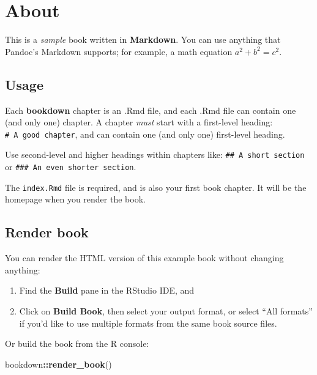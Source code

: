 \documentclass[
]{book}
\newenvironment{Shaded}{\begin{snugshade}}{\end{snugshade}}
\newcommand{\FunctionTok}[1]{\textcolor[rgb]{0.13,0.29,0.53}{\textbf{#1}}}
\newcommand{\NormalTok}[1]{#1}
\newcommand{\SpecialCharTok}[1]{\textcolor[rgb]{0.81,0.36,0.00}{\textbf{#1}}}
\theoremstyle{definition}
\theoremstyle{definition}
\theoremstyle{definition}
\theoremstyle{definition}
\theoremstyle{remark}
\begin{document}
\section{About}\label{about}

This is a \emph{sample} book written in \textbf{Markdown}. You can use anything that Pandoc's Markdown supports; for example, a math equation \(a^2 + b^2 = c^2\).

\subsection{Usage}\label{usage}

Each \textbf{bookdown} chapter is an .Rmd file, and each .Rmd file can contain one (and only one) chapter. A chapter \emph{must} start with a first-level heading: \texttt{\#\ A\ good\ chapter}, and can contain one (and only one) first-level heading.

Use second-level and higher headings within chapters like: \texttt{\#\#\ A\ short\ section} or \texttt{\#\#\#\ An\ even\ shorter\ section}.

The \texttt{index.Rmd} file is required, and is also your first book chapter. It will be the homepage when you render the book.

\subsection{Render book}\label{render-book}

You can render the HTML version of this example book without changing anything:

\begin{enumerate}
\def\labelenumi{\arabic{enumi}.}
\item
  Find the \textbf{Build} pane in the RStudio IDE, and
\item
  Click on \textbf{Build Book}, then select your output format, or select ``All formats'' if you'd like to use multiple formats from the same book source files.
\end{enumerate}

Or build the book from the R console:

\begin{Shaded}
\begin{Highlighting}[]
\NormalTok{bookdown}\SpecialCharTok{::}\FunctionTok{render\_book}\NormalTok{()}
\end{Highlighting}
\end{Shaded}
\end{document}
